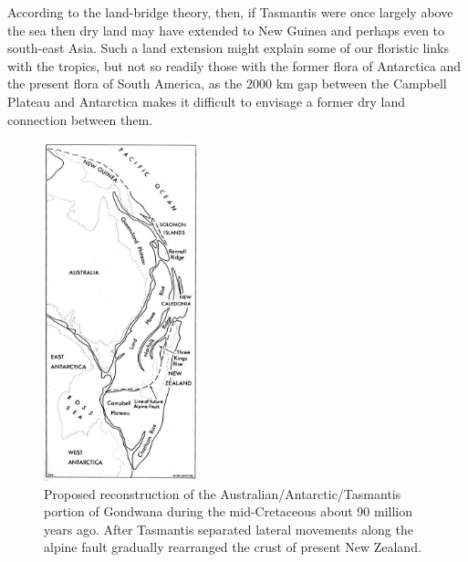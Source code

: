 According to the land-bridge theory, then, if Tasmantis were once largely above the sea then dry land may have extended to New Guinea and perhaps even to south-east Asia.
Such a land extension might explain some of our floristic links with the tropics, but not so readily those with the former flora of Antarctica and the present flora of South America, as the 2000 km gap between the Campbell Plateau and Antarctica makes it difficult to envisage a former dry land connection between them.

\begin{figure}
	\includegraphics[width=0.4\textwidth]{graphics/figure3gondwana.jpg}
	\centering
	\caption[Proposed reconstruction of the Australian/Antarctic/Tasmantis portion of Gondwana]{Proposed reconstruction of the Australian/Antarctic/Tasmantis portion of Gondwana during the mid-Cretaceous about 90 million years ago.
After Tasmantis separated lateral movements along the alpine fault gradually rearranged the crust of present New Zealand.}%
	\label{fig:3gondwana}
\end{figure}

